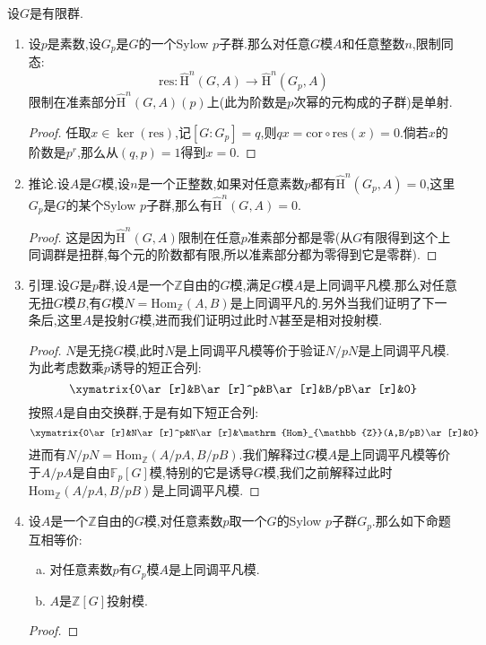 设$G$是有限群.
\begin{enumerate}
	\item 设$p$是素数,设$G_p$是$G$的一个Sylow $p$子群.那么对任意$G$模$A$和任意整数$n$,限制同态:
	$$\mathrm{res}:\widehat{\mathrm{H}}^n(G,A)\to\widehat{\mathrm{H}}^n(G_p,A)$$
	限制在准素部分$\widehat{\mathrm{H}}^n(G,A)(p)$上(此为阶数是$p$次幂的元构成的子群)是单射.
	\begin{proof}
		
		任取$x\in\ker(\mathrm{res})$,记$[G:G_p]=q$,则$qx=\mathrm{cor}\circ\mathrm{res}(x)=0$.倘若$x$的阶数是$p^r$,那么从$(q,p)=1$得到$x=0$.
	\end{proof}
	\item 推论.设$A$是$G$模,设$n$是一个正整数,如果对任意素数$p$都有$\widehat{\mathrm{H}}^n(G_p,A)=0$,这里$G_p$是$G$的某个Sylow $p$子群,那么有$\widehat{\mathrm{H}}^n(G,A)=0$.
	\begin{proof}
		
		这是因为$\widehat{\mathrm{H}}^n(G,A)$限制在任意$p$准素部分都是零(从$G$有限得到这个上同调群是扭群,每个元的阶数都有限,所以准素部分都为零得到它是零群).
	\end{proof}
	\item 引理.设$G$是$p$群,设$A$是一个$\mathbb{Z}$自由的$G$模,满足$G$模$A$是上同调平凡模.那么对任意无扭$G$模$B$,有$G$模$N=\mathrm{Hom}_{\mathbb{Z}}(A,B)$是上同调平凡的.另外当我们证明了下一条后,这里$A$是投射$G$模,进而我们证明过此时$N$甚至是相对投射模.
	\begin{proof}
		
		$N$是无挠$G$模,此时$N$是上同调平凡模等价于验证$N/pN$是上同调平凡模.为此考虑数乘$p$诱导的短正合列:
		$$\xymatrix{0\ar[r]&B\ar[r]^p&B\ar[r]&B/pB\ar[r]&0}$$
		按照$A$是自由交换群,于是有如下短正合列:
		$$\xymatrix{0\ar[r]&N\ar[r]^p&N\ar[r]&\mathrm{Hom}_{\mathbb{Z}}(A,B/pB)\ar[r]&0}$$
		进而有$N/pN=\mathrm{Hom}_{\mathbb{Z}}(A/pA,B/pB)$.我们解释过$G$模$A$是上同调平凡模等价于$A/pA$是自由$\mathbb{F}_p[G]$模,特别的它是诱导$G$模,我们之前解释过此时$\mathrm{Hom}_{\mathbb{Z}}(A/pA,B/pB)$是上同调平凡模.
	\end{proof}
	\item 设$A$是一个$\mathbb{Z}$自由的$G$模,对任意素数$p$取一个$G$的Sylow $p$子群$G_p$.那么如下命题互相等价:
	\begin{enumerate}[(a)]
		\item 对任意素数$p$有$G_p$模$A$是上同调平凡模.
		\item $A$是$\mathbb{Z}[G]$投射模.
	\end{enumerate}
	\begin{proof}
		

\end{proof}
\end{enumerate}

